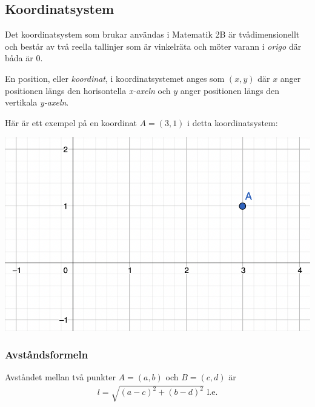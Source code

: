\subsection{Koordinatsystem}
\label{Koordinatsystem}

Det koordinatsystem som brukar användas i Matematik 2B är tvådimensionellt och består av två reella tallinjer som är vinkelräta och möter varann i \textit{origo} där båda är $0$.

En position, eller \textit{koordinat}, i koordinatsystemet anges som $(x, y)$ där $x$ anger positionen längs den horisontella \textit{x-axeln} och $y$ anger positionen längs den vertikala \textit{y-axeln}.

Här är ett exempel på en koordinat $A = (3, 1)$ i detta koordinatsystem:

\includegraphics[width=\textwidth]{img/1.png}

\newpage
\subsubsection{Avståndsformeln}

\begin{theorem}[Avståndsformeln]
	Avståndet mellan två punkter $A=(a,b)$ och $B=(c,d)$ är
	\begin{align}
		l = \sqrt{(a-c)^2+(b-d)^2} \text{ l.e}.
	\end{align}
\end{theorem}

